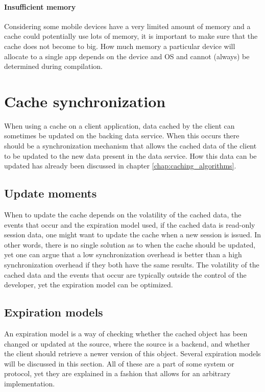 \documentclass[pdftex,a4paper,12pt,twoside]{report}
\begin{document}
\paragraph{Insufficient memory} Considering some mobile devices have a very limited amount of memory and a cache could potentially use lots of memory, it is important to make sure that the cache does not become to big. How much memory a particular device will allocate to a single app depends on the device and OS and cannot (always) be determined during compilation.
\section{Cache synchronization}
When using a cache on a client application, data cached by the client can sometimes be updated on the backing data service. When this occurs there should be a synchronization mechanism that allows the cached data of the client to be updated to the new data present in the data service. How this data can be updated has already been discussed in chapter \ref{chap:caching_algorithms}.
\subsection{Update moments}
When to update the cache depends on the volatility of the cached data, the events that occur and the expiration model used, if the cached data is read-only session data, one might want to update the cache when a new session is issued. In other words, there is no single solution as to when the cache should be updated, yet one can argue that a low synchronization overhead is better than a high synchronization overhead if they both have the same results. The volatility of the cached data and the events that occur are typically outside the control of the developer, yet the expiration model can be optimized.
\subsection{Expiration models}
An expiration model is a way of checking whether the cached object has been changed or updated at the source, where the source is a backend, and whether the client should retrieve a newer version of this object. Several expiration models will be discussed in this section. All of these are a part of some system or protocol, yet they are explained in a fashion that allows for an arbitrary implementation.
\end{document}

